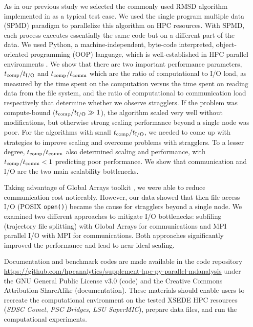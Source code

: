 As in our previous study we selected the commonly used RMSD algorithm implemented in  as a typical test case.
We used the single program multiple data (SPMD) paradigm to parallelize this algorithm on HPC resources.
With SPMD, each process executes essentially the same code but on a different part of the data. 
We used Python, a machine-independent, byte-code interpreted, object-oriented programming (OOP) language, which is well-established in HPC parallel environments \cite{GAiN}. 
We show that there are two important performance parameters, ${t}_{\text{comp}}/{t}_{\text{I/O}}$ and ${t}_{\text{comp}}/t_{\text{comm}}$ which are the ratio of computational to I/O load, as measured by the time spent on the computation versus the time spent on reading data from the file system, and the ratio of computational to communication load respectively that determine whether we observe stragglers.
If the problem was compute-bound (${t}_{\text{comp}}/{t}_{\text{I/O}} \gg 1$), the algorithm scaled very well without modifications, but otherwise strong scaling performance beyond a single node was poor.  
For the algorithms with small ${t}_{\text{comp}}/{t}_{\text{I/O}}$, we needed to come up with strategies to improve scaling and overcome problems with stragglers.
To a lesser degree, ${t}_{\text{comp}}/t_{\text{comm}}$ also determined scaling and performance, with ${t}_{\text{comp}}/t_{\text{comm}} < 1$ predicting poor performance.
We show that communication and I/O are the two main scalability bottlenecks.

Taking advantage of Global Arrays toolkit \cite{GA, GAiN}, we were able to reduce communication cost noticeably.
However, our data showed that then file access I/O (POSIX \texttt{open()}) became the cause for stragglers beyond a single node.
We examined two different approaches to mitigate I/O bottlenecks: subfiling (trajectory file splitting) with Global Arrays for communications and MPI parallel I/O with MPI for communications.
Both approaches significantly improved the performance and lead to near ideal scaling.

Documentation and benchmark codes are made available in the code repository \url{https://github.com/hpcanalytics/supplement-hpc-py-parallel-mdanalysis} under the GNU General Public License v3.0 (code) and the Creative Commons Attribution-ShareAlike (documentation). 
These materials should enable users to recreate the computational environment on the tested XSEDE HPC resources (\emph{SDSC Comet}, \emph{PSC Bridges}, \emph{LSU SuperMIC}), prepare data files, and run the computational experiments.